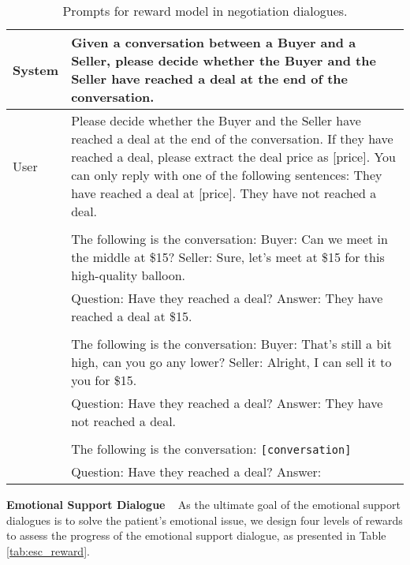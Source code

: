 \documentclass{article} %
\begin{document}
\begin{table}[h]
    \centering
    \begin{tabular}{lp{11cm}}
    \toprule
    System   &  Given a conversation between a Buyer and a Seller, please decide whether the Buyer and the Seller have reached a deal at the end of the conversation. \\
    \midrule
    User    &  Please decide whether the Buyer and the Seller have reached a deal at the end of the conversation. If they have reached a deal, please extract the deal price as [price]. You can only reply with one of the following sentences: They have reached a deal at [price]. They have not reached a deal. \\
    \\
    & The following is the conversation: Buyer: Can we meet in the middle at \$15? Seller: Sure, let's meet at \$15 for this high-quality balloon.\\
    & Question: Have they reached a deal? Answer: They have reached a deal at \$15.\\
    \\
    &The following is the conversation: Buyer: That's still a bit high, can you go any lower? Seller: Alright, I can sell it to you for \$15.\\
    & Question: Have they reached a deal? Answer: They have not reached a deal.\\
    \\
    &The following is the conversation: \texttt{[conversation]}\\
    & Question: Have they reached a deal? Answer: \\
    \bottomrule
    \end{tabular}
    \caption{Prompts for reward model in negotiation dialogues.}
    \label{tab:cb_reward}
\end{table}

\noindent \textbf{Emotional Support Dialogue} ~ 
As the ultimate goal of the emotional support dialogues is to solve the patient's emotional issue, we design four levels of rewards to assess the progress of the emotional support dialogue, as presented in Table \ref{tab:esc_reward}. 
\end{document}
